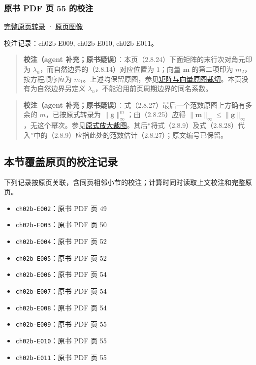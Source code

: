 \documentclass[
  10pt,
  fontset=fandol]{ctexart}
\providecommand{\tightlist}{%
  \setlength{\itemsep}{0pt}\setlength{\parskip}{0pt}}
\begin{document}
\subsubsection{原书 PDF 页 55 的校注}\label{ux539fux4e66-pdf-ux9875-55-ux7684ux6821ux6ce8}

\href{../pages/pdf-055.md}{完整原页转录} · \href{../../source-images/pdf-055.jpeg}{原页图像}

校注记录：ch02b-E009, ch02b-E010, ch02b-E011。

\begin{quote}
\textbf{校注（agent 补充；原书疑误）}：本页（2.8.24）下面矩阵的末行次对角元印为 \(\lambda_n\)，而自然边界的（2.8.14）对应位置为 \(1\)；向量 \(\boldsymbol m\) 的第二项印为 \(m_2\)，按方程顺序应为 \(m_1\)。上述均保留原图，参见\href{../assets/ch02b/pdf-055-matrix-detail.png}{矩阵与向量原图裁切}。本页没有为自然边界另定义 \(\lambda_n\)，不能沿用前页周期边界的同名系数。
\end{quote}

\begin{quote}
\textbf{校注（agent 补充；原书疑误）}：式（2.8.27）最后一个范数原图上方确有多余的 \(m\)，已按原式转录为 \(\|\boldsymbol g\|_\infty^m\)；由（2.8.25）应得 \(\|\boldsymbol m\|_\infty\leqslant\|\boldsymbol g\|_\infty\)，无这个幂次。参见\href{../assets/ch02b/pdf-055-eq-2-8-27-detail.png}{原式放大裁图}。其后``将式（2.8.9）及式（2.8.28）代入''中的（2.8.9）应指此处的范数估计（2.8.27）；原文编号已保留。
\end{quote}

\subsection{本节覆盖原页的校注记录}\label{ux672cux8282ux8986ux76d6ux539fux9875ux7684ux6821ux6ce8ux8bb0ux5f55}

下列记录按原页关联，含同页相邻小节的校注；计算时同时读取上文校注和完整原页。

\begin{itemize}
\tightlist
\item
  \texttt{ch02b-E002}：原书 PDF 页 49
\item
  \texttt{ch02b-E003}：原书 PDF 页 50
\item
  \texttt{ch02b-E004}：原书 PDF 页 52
\item
  \texttt{ch02b-E005}：原书 PDF 页 52
\item
  \texttt{ch02b-E006}：原书 PDF 页 54
\item
  \texttt{ch02b-E007}：原书 PDF 页 54
\item
  \texttt{ch02b-E008}：原书 PDF 页 54
\item
  \texttt{ch02b-E009}：原书 PDF 页 55
\item
  \texttt{ch02b-E010}：原书 PDF 页 55
\item
  \texttt{ch02b-E011}：原书 PDF 页 55
\end{itemize}
\end{document}
